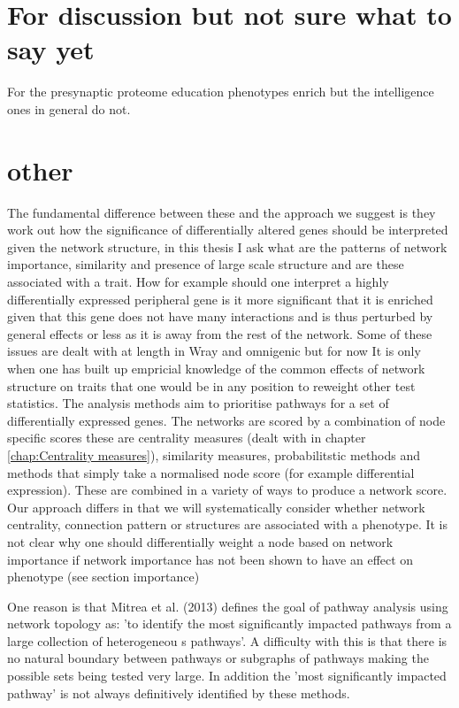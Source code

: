 \section{For discussion but not sure what to say yet}

For the presynaptic proteome education phenotypes enrich but the intelligence ones in general do not. 

 	 \section{other}
 	The fundamental difference between these and the approach we suggest is they work out how the significance of differentially altered genes should be interpreted given the network structure, in this thesis I ask what are the patterns of network importance, similarity and presence of large scale structure and are these associated with a trait. How for example should one interpret a highly differentially expressed peripheral gene  is it more significant that it is enriched given that this gene does not have many interactions and is thus perturbed by general effects or less as it is away from the rest of the network. Some of these issues are dealt with at length in Wray and omnigenic but for now  It is only when one has built up empricial knowledge of the common effects of network structure on traits that one would be in any position to reweight other test statistics. The analysis methods aim to prioritise pathways for a set of differentially expressed genes. The networks are scored by a combination of node specific scores these are centrality measures (dealt with in chapter \ref{chap:Centrality measures}), similarity measures, probabilitstic methods and methods that simply take a normalised node score (for example differential expression). These are combined in a variety of ways to produce a network score. Our approach differs in that we will systematically consider whether network centrality, connection pattern or structures are associated with a phenotype. It is not clear why one should differentially weight a node based on network importance if network importance has not been shown to have an effect on phenotype (see section importance)

One reason is that Mitrea et al. (2013) \cite{mitra2013integrative} defines the goal of pathway analysis using network topology as: 'to identify the most significantly impacted pathways from a large collection of heterogeneou s pathways'. A difficulty with this is that there is no natural boundary between pathways or subgraphs of pathways making the possible sets being tested very large. In addition the 'most significantly impacted pathway' is not always definitively identified by these methods. 


